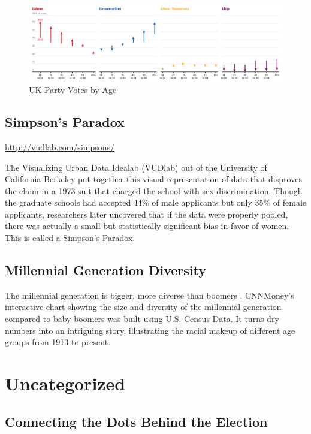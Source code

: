 \documentclass[]{book}
\theoremstyle{definition}
\theoremstyle{definition}
\theoremstyle{definition}
\theoremstyle{remark}
\begin{document}
\begin{figure}
\centering
\includegraphics{images/Party_Votes_by_Age.png}
\caption{UK Party Votes by Age}
\end{figure}

\subsection{Simpson's Paradox}\label{simpsons-paradox}

\url{http://vudlab.com/simpsons/}

The Visualizing Urban Data Idealab (VUDlab) out of the University of
California-Berkeley put together this visual representation of data that
disproves the claim in a 1973 suit that charged the school with sex
discrimination. Though the graduate schools had accepted 44\% of male
applicants but only 35\% of female applicants, researchers later
uncovered that if the data were properly pooled, there was actually a
small but statistically significant bias in favor of women. This is
called a Simpson's Paradox.

\subsection{Millennial Generation
Diversity}\label{millennial-generation-diversity}

The millennial generation is bigger, more diverse than boomers
\citep{age_groups}. CNNMoney's interactive chart showing the size and
diversity of the millennial generation compared to baby boomers was
built using U.S. Census Data. It turns dry numbers into an intriguing
story, illustrating the racial makeup of different age groups from 1913
to present.

\section{Uncategorized}\label{uncategorized}

\subsection{Connecting the Dots Behind the
Election}\label{connecting-the-dots-behind-the-election}
\end{document}
